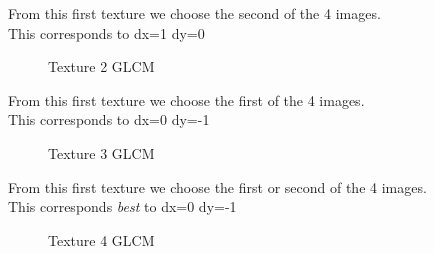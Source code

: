 \documentclass{article}
\begin{document}
	From this first texture we choose the second of the 4 images.\\
	This corresponds to dx=1 dy=0  


	\begin{figure}[h!]%
		\centering
    	\caption{Texture 2 GLCM}%
    	\label{fig:o1_f2}%
	\end{figure}

	From this first texture we choose the first of the 4 images.\\
	This corresponds to dx=0 dy=-1  
\newpage
	\begin{figure}[h!]%
		\centering
    	\caption{Texture 3 GLCM}%
    	\label{fig:o1_f3}%
	\end{figure}

	From this first texture we choose the first or second of the 4 images.\\
	This corresponds \textit{best} to dx=0 dy=-1  

	\begin{figure}[h!]%
		\centering
    	\caption{Texture 4 GLCM}%
    	\label{fig:o1_f4}%
	\end{figure}
\end{document}
